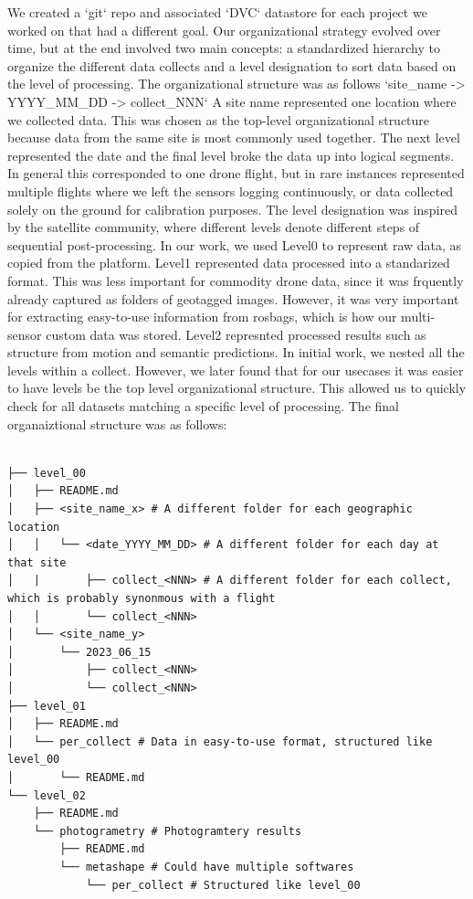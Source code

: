 We created a `git` repo and associated `DVC` datastore for each project we worked on that had a different goal. Our organizational strategy evolved over time, but at the end involved two main concepts: a standardized hierarchy to organize the different data collects and a level designation to sort data based on the level of processing. The organizational structure was as follows `site\_name -> YYYY\_MM\_DD -> collect\_NNN` A site name represented one location where we collected data. This was chosen as the top-level organizational structure because data from the same site is most commonly used together. The next level represented the date and the final level broke the data up into logical segments. In general this corresponded to one drone flight, but in rare instances represented multiple flights where we left the sensors logging continuously, or data collected solely on the ground for calibration purposes. The level designation was inspired by the satellite community, where different levels denote different steps of sequential post-processing. In our work, we used Level0 to represent raw data, as copied from the platform. Level1 represented data processed into a standarized format. This was less important for commodity drone data, since it was frquently already captured as folders of geotagged images. However, it was very important for extracting easy-to-use information from rosbags, which is how our multi-sensor custom data was stored. Level2 represnted processed results such as structure from motion and semantic predictions. In initial work, we nested all the levels within a collect. However, we later found that for our usecases it was easier to have levels be the top level organizational structure. This allowed us to quickly check for all datasets matching a specific level of processing. The final organaiztional structure was as follows:


\begin{verbatim}
    
├── level_00
│   ├── README.md
│   ├── <site_name_x> # A different folder for each geographic location
│   │   └── <date_YYYY_MM_DD> # A different folder for each day at that site
│   |       ├── collect_<NNN> # A different folder for each collect, which is probably synonmous with a flight
│   │       └── collect_<NNN>
│   └── <site_name_y>
│       └── 2023_06_15
│           ├── collect_<NNN>
│           └── collect_<NNN>
├── level_01 
│   ├── README.md
│   └── per_collect # Data in easy-to-use format, structured like level_00
│       └── README.md
└── level_02
    ├── README.md
    └── photogrametry # Photogramtery results
        ├── README.md
        └── metashape # Could have multiple softwares
            └── per_collect # Structured like level_00
\end{verbatim}

